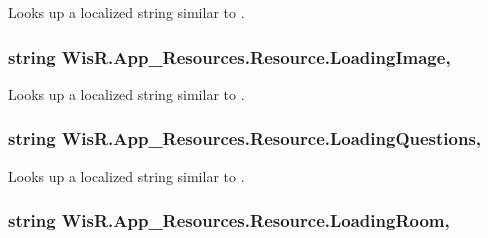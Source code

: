 Looks up a localized string similar to . 

\hypertarget{class_wis_r_1_1_app___resources_1_1_resource_af20d3339283f2b112f1aa40ce4568ed2}{}
\subsubsection[{Loading\+Image}]{\setlength{\rightskip}{0pt plus 5cm}string Wis\+R.\+App\+\_\+\+Resources.\+Resource.\+Loading\+Image\hspace{0.3cm}{\ttfamily [static]}, {\ttfamily [get]}}\label{class_wis_r_1_1_app___resources_1_1_resource_af20d3339283f2b112f1aa40ce4568ed2}


Looks up a localized string similar to . 

\hypertarget{class_wis_r_1_1_app___resources_1_1_resource_a95449f36922bdc6fdc8ef4285917538f}{}
\subsubsection[{Loading\+Questions}]{\setlength{\rightskip}{0pt plus 5cm}string Wis\+R.\+App\+\_\+\+Resources.\+Resource.\+Loading\+Questions\hspace{0.3cm}{\ttfamily [static]}, {\ttfamily [get]}}\label{class_wis_r_1_1_app___resources_1_1_resource_a95449f36922bdc6fdc8ef4285917538f}


Looks up a localized string similar to . 

\hypertarget{class_wis_r_1_1_app___resources_1_1_resource_aa17890d1187ed4141f3a825444e22d60}{}
\subsubsection[{Loading\+Room}]{\setlength{\rightskip}{0pt plus 5cm}string Wis\+R.\+App\+\_\+\+Resources.\+Resource.\+Loading\+Room\hspace{0.3cm}{\ttfamily [static]}, {\ttfamily [get]}}\label{class_wis_r_1_1_app___resources_1_1_resource_aa17890d1187ed4141f3a825444e22d60}


